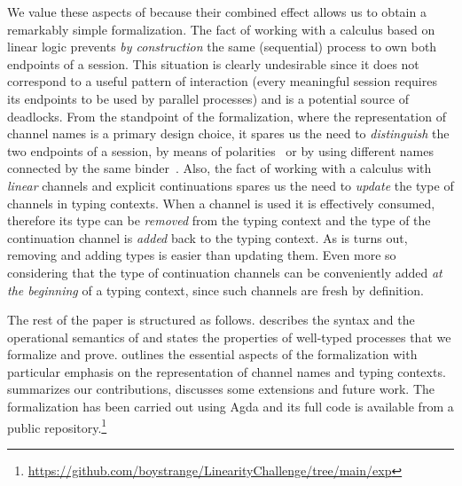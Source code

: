 We value these aspects of \Calculus because their combined effect allows us to
obtain a remarkably simple formalization.
%
The fact of working with a calculus based on linear logic prevents \emph{by
construction} the same (sequential) process to own both endpoints of a session.
This situation is clearly undesirable since it does not correspond to a useful
pattern of interaction (every meaningful session requires its endpoints to be
used by parallel processes) and is a potential source of deadlocks.
%
From the standpoint of the formalization, where the representation of channel
names is a primary design choice, it spares us the need to \emph{distinguish}
the two endpoints of a session, \eg by means of polarities~\citep{GayHole05} or
by using different names connected by the same
binder~\citep{Vasconcelos12,GayVasconcelos25}.
%
Also, the fact of working with a calculus with \emph{linear} channels and
explicit continuations spares us the need to \emph{update} the type of channels
in typing contexts. When a channel is used it is effectively consumed, therefore
its type can be \emph{removed} from the typing context and the type of the
continuation channel is \emph{added} back to the typing context. As is turns
out, removing and adding types is easier than updating them. Even more so
considering that the type of continuation channels can be conveniently added
\emph{at the beginning} of a typing context, since such channels are fresh by
definition.

The rest of the paper is structured as follows.  describes
the syntax and the operational semantics of \Calculus and states the properties
of well-typed processes that we formalize and prove.  outlines
the essential aspects of the formalization with particular emphasis on the
representation of channel names and typing contexts. 
summarizes our contributions, discusses some extensions and future work. The
formalization has been carried out using Agda and its full code is available
from a public
repository.\footnote{\url{https://github.com/boystrange/LinearityChallenge/tree/main/exp}}